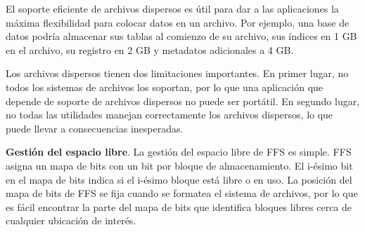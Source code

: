 \documentclass[10pt]{book}
\begin{document}
El soporte eficiente de archivos dispersos es útil para dar a las aplicaciones la máxima flexibilidad para colocar datos en un archivo. Por ejemplo, una base de datos podría almacenar sus tablas al comienzo de su archivo, sus índices en 1 GB en el archivo, su registro en 2 GB y metadatos adicionales a 4 GB.

Los archivos dispersos tienen dos limitaciones importantes. En primer lugar, no todos los sistemas de archivos los soportan, por lo que una aplicación que depende de soporte de archivos dispersos no puede ser portátil. En segundo lugar, no todas las utilidades manejan correctamente los archivos dispersos, lo que puede llevar a consecuencias inesperadas.

\textbf{Gestión del espacio libre}. La gestión del espacio libre de FFS es simple. FFS asigna un mapa de bits con un bit por bloque de almacenamiento. El i-ésimo bit en el mapa de bits indica si el i-ésimo bloque está libre o en uso. La posición del mapa de bits de FFS se fija cuando se formatea el sistema de archivos, por lo que es fácil encontrar la parte del mapa de bits que identifica bloques libres cerca de cualquier ubicación de interés.
\end{document}
